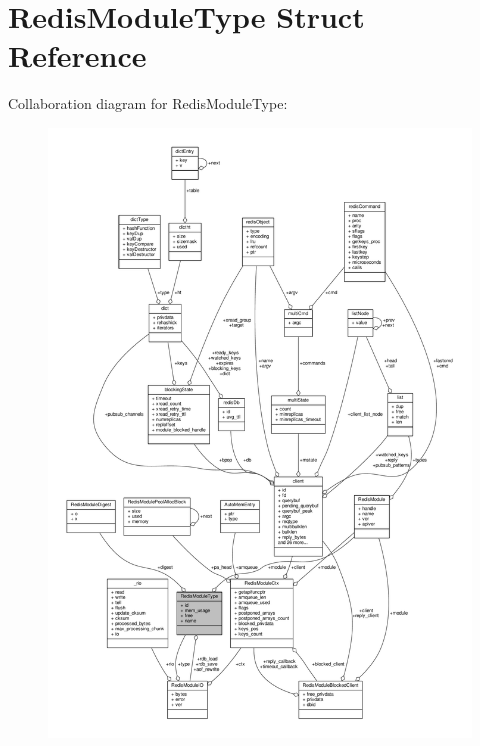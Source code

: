 \hypertarget{structRedisModuleType}{}\section{Redis\+Module\+Type Struct Reference}
\label{structRedisModuleType}


Collaboration diagram for Redis\+Module\+Type\+:\nopagebreak
\begin{figure}[H]
\begin{center}
\leavevmode
\includegraphics[width=350pt]{structRedisModuleType__coll__graph}
\end{center}
\end{figure}
